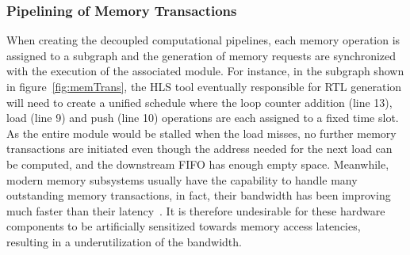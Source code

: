 \subsubsection{Pipelining of Memory Transactions}
When creating the decoupled computational pipelines,
each memory operation is assigned to a subgraph and
the generation of memory requests are synchronized with
the execution of the associated module. For instance, in
the subgraph shown in figure~\ref{fig:memTrans}, the HLS tool eventually
responsible for RTL generation will need to create a unified
schedule where the loop counter addition (line 13), load (line
9) and push (line 10) operations are each assigned to a
fixed time slot. As the entire module would be stalled when
the load misses, no further memory transactions are initiated
even though the address needed for the next load can be
computed, and the downstream FIFO has enough empty space.
Meanwhile, modern memory subsystems usually have the
capability to handle many outstanding memory transactions,
in fact, their bandwidth has been improving much faster than
their latency~\cite{Patterson:2004}. It is therefore undesirable for these hardware
components to be artificially sensitized towards memory access
latencies, resulting in a underutilization of the bandwidth.


